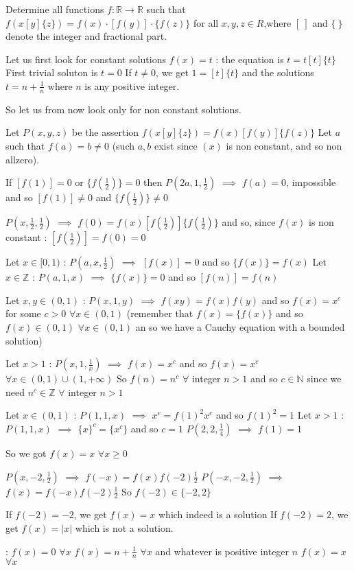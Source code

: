 \begin{solution}
	\begin{tcolorbox}Determine all functions $f: \mathbb{R}\to\mathbb{R}$ such that $f(x[y]\{z\})=f(x){\cdot}[f(y)]{\cdot}\{f(z)\}$ for all $x,y,z{\in}R$,where $[\ ]$ and $\{\ \}$ denote the integer and fractional part.\end{tcolorbox}
Let us first look for constant solutions $f(x)=t$ : the equation is $t=t[t]\{t\}$
First trivial soluton is $t=0$
If $t\ne 0$, we get $1=[t]\{t\}$ and the solutions $t=n+\frac 1n$ where $n$ is any positive integer.

So let us from now look only for non constant solutions.

Let $P(x,y,z)$ be the assertion $f(x[y]\{z\})=f(x)[f(y)]\{f(z)\}$
Let $a$ such that $f(a)=b\ne 0$ (such $a,b$ exist since $(x)$ is non constant, and so non allzero).

If $[f(1)]=0$ or $\{f(\frac 12)\}=0$ then $P(2a,1,\frac 12)$ $\implies$ $f(a)=0$, impossible and so $[f(1)]\ne 0$ and $\{f(\frac 12)\}\ne 0$

$P(x,\frac 12,\frac 12)$ $\implies$ $f(0)=f(x)[f(\frac 12)]\{f(\frac 12)\}$ and so, since $f(x)$ is non constant : $[f(\frac 12)]=f(0)=0$

Let $x\in[0,1)$ : $P(a,x,\frac 12)$ $\implies$ $[f(x)]=0$ and so $\{f(x)\}=f(x)$
Let $x\in\mathbb Z$ : $P(a,1,x)$ $\implies$ $\{f(x)\}=0$ and so $[f(n)]=f(n)$

Let $x,y\in(0,1)$ : $P(x,1,y)$ $\implies$ $f(xy)=f(x)f(y)$ and so $f(x)=x^c$ for some $c>0$ $\forall x\in(0,1)$
(remember that $f(x)=\{f(x)\}$ and so $f(x)\in(0,1)$ $\forall x\in(0,1)$ an so we have a Cauchy equation with a bounded solution)

Let $x>1$ : $P(x,1,\frac 1x)$ $\implies$ $f(x)=x^c$ and so $f(x)=x^c$ $\forall x\in(0,1)\cup(1,+\infty)$
So $f(n)=n^c$ $\forall$ integer $n>1$ and so $c\in\mathbb N$ since we need $n^c\in\mathbb Z$ $\forall$ integer $n>1$

Let $x\in(0,1)$ : $P(1,1,x)$ $\implies$ $x^c=f(1)^2x^c$ and so $f(1)^2=1$
Let $x>1$ : $P(1,1,x)$ $\implies$ $\{x\}^c=\{x^c\}$ and so $c=1$
$P(2,2,\frac 14)$ $\implies$ $f(1)=1$

So we got $f(x)=x$ $\forall x\ge 0$

$P(x,-2,\frac 12)$ $\implies$ $f(-x)=f(x)f(-2)\frac 12$
$P(-x,-2,\frac 12)$ $\implies$ $f(x)=f(-x)f(-2)\frac 12$
So $f(-2)\in\{-2,2\}$

If $f(-2)=-2$, we get $f(x)=x$ which indeed is a solution
If $f(-2)=2$, we get $f(x)=|x|$ which is not a solution.

 :
$f(x)=0$ $\forall x$
$f(x)=n+\frac 1n$ $\forall x$ and whatever is positive integer $n$
$f(x)=x$ $\forall x$
\end{solution}



